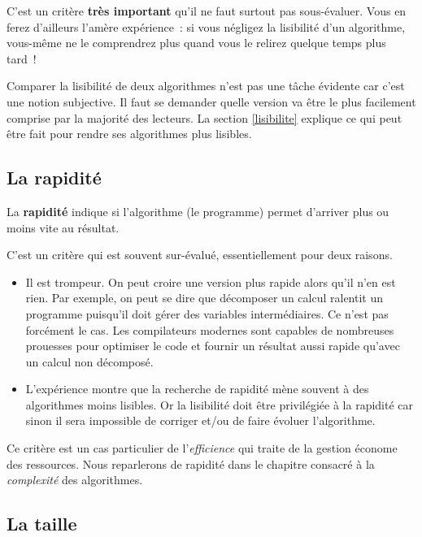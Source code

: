 			C’est un critère \textbf{très important}
			qu’il ne faut surtout pas sous-évaluer.
			Vous en ferez d’ailleurs l’amère expérience~:
			si vous négligez la lisibilité d’un algorithme,
			vous-même ne le comprendrez plus quand vous le relirez
			quelque temps plus tard~!
			
			Comparer la lisibilité de deux algorithmes
			n’est pas une tâche évidente car c’est une notion subjective.
			Il faut se demander quelle version va être le plus facilement
			comprise par la majorité des lecteurs.		
			La section \vref{lisibilite}
			explique ce qui peut être fait pour rendre ses algorithmes
			plus lisibles.
				
		\subsection{La rapidité}
	    
			La \textbf{rapidité}
			indique si l’algorithme (le programme)
			permet d’arriver plus ou moins vite au résultat.
			
			C’est un critère qui est souvent sur-évalué, 
			essentiellement pour deux raisons.
			\begin{itemize}
				\item 
					Il est trompeur. 
					On peut croire une version plus rapide alors qu’il n’en est rien.
					Par exemple, on peut se dire que décomposer un calcul
					ralentit un programme puisqu’il doit gérer des variables
					intermédiaires.
					Ce n’est pas forcément le cas.
					Les compilateurs modernes sont capables
					de nombreuses prouesses pour optimiser le code
					et fournir un résultat aussi rapide
					qu’avec un calcul non décomposé.
				\item
					L’expérience montre que la recherche de rapidité
					mène souvent à des algorithmes moins lisibles.
					Or la lisibilité doit être privilégiée à la rapidité
					car sinon il sera impossible de corriger et/ou
					de faire évoluer l’algorithme.
			\end{itemize}
		
			Ce critère est un cas particulier de l’\emph{efficience}
			qui traite de la gestion économe des ressources.
			Nous reparlerons de rapidité
			dans le chapitre consacré à la \emph{complexité}
			des algorithmes.
		
		\subsection{La taille}
		
